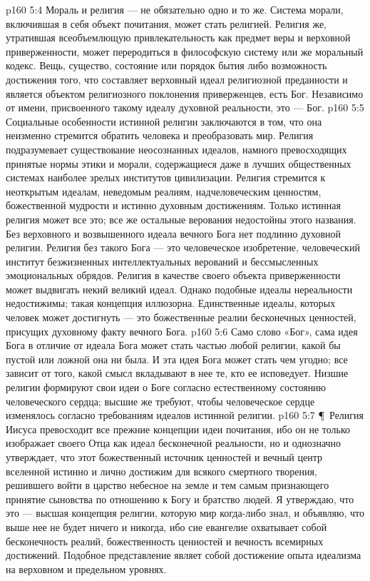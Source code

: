 \vs p160 5:4 Мораль и религия --- не обязательно одно и то же. Система морали, включившая в себя объект почитания, может стать религией. Религия же, утратившая всеобъемлющую привлекательность как предмет веры и верховной приверженности, может переродиться в философскую систему или же моральный кодекс. Вещь, существо, состояние или порядок бытия либо возможность достижения того, что составляет верховный идеал религиозной преданности и является объектом религиозного поклонения приверженцев, есть Бог. Независимо от имени, присвоенного такому идеалу духовной реальности, это --- Бог.
\vs p160 5:5 Социальные особенности истинной религии заключаются в том, что она неизменно стремится обратить человека и преобразовать мир. Религия подразумевает существование неосознанных идеалов, намного превосходящих принятые нормы этики и морали, содержащиеся даже в лучших общественных системах наиболее зрелых институтов цивилизации. Религия стремится к неоткрытым идеалам, неведомым реалиям, надчеловеческим ценностям, божественной мудрости и истинно духовным достижениям. Только истинная религия может все это; все же остальные верования недостойны этого названия. Без верховного и возвышенного идеала вечного Бога нет подлинно духовной религии. Религия без такого Бога --- это человеческое изобретение, человеческий институт безжизненных интеллектуальных верований и бессмысленных эмоциональных обрядов. Религия в качестве своего объекта приверженности может выдвигать некий великий идеал. Однако подобные идеалы нереальности недостижимы; такая концепция иллюзорна. Единственные идеалы, которых человек может достигнуть --- это божественные реалии бесконечных ценностей, присущих духовному факту вечного Бога.
\vs p160 5:6 Само слово «Бог», сама идея Бога в отличие от идеала Бога может стать частью любой религии, какой бы пустой или ложной она ни была. И эта идея Бога может стать чем угодно; все зависит от того, какой смысл вкладывают в нее те, кто ее исповедует. Низшие религии формируют свои идеи о Боге согласно естественному состоянию человеческого сердца; высшие же требуют, чтобы человеческое сердце изменялось согласно требованиям идеалов истинной религии.
\vs p160 5:7 \P\ Религия Иисуса превосходит все прежние концепции идеи почитания, ибо он не только изображает своего Отца как идеал бесконечной реальности, но и однозначно утверждает, что этот божественный источник ценностей и вечный центр вселенной истинно и лично достижим для всякого смертного творения, решившего войти в царство небесное на земле и тем самым признающего принятие сыновства по отношению к Богу и братство людей. Я утверждаю, что это --- высшая концепция религии, которую мир когда\hyp{}либо знал, и объявляю, что выше нее не будет ничего и никогда, ибо сие евангелие охватывает собой бесконечность реалий, божественность ценностей и вечность всемирных достижений. Подобное представление являет собой достижение опыта идеализма на верховном и предельном уровнях.
